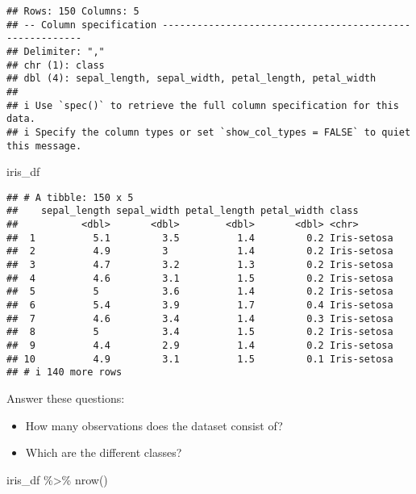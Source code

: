 \documentclass[
  oneside]{book}
\newenvironment{Shaded}{\begin{snugshade}}{\end{snugshade}}
\newcommand{\FunctionTok}[1]{\textcolor[rgb]{0.00,0.00,0.00}{#1}}
\newcommand{\NormalTok}[1]{#1}
\newcommand{\SpecialCharTok}[1]{\textcolor[rgb]{0.00,0.00,0.00}{#1}}
\providecommand{\tightlist}{%
  \setlength{\itemsep}{0pt}\setlength{\parskip}{0pt}}
\begin{document}
\begin{verbatim}
## Rows: 150 Columns: 5
## -- Column specification --------------------------------------------------------
## Delimiter: ","
## chr (1): class
## dbl (4): sepal_length, sepal_width, petal_length, petal_width
## 
## i Use `spec()` to retrieve the full column specification for this data.
## i Specify the column types or set `show_col_types = FALSE` to quiet this message.
\end{verbatim}

\begin{Shaded}
\begin{Highlighting}[]
\NormalTok{iris\_df}
\end{Highlighting}
\end{Shaded}

\begin{verbatim}
## # A tibble: 150 x 5
##    sepal_length sepal_width petal_length petal_width class      
##           <dbl>       <dbl>        <dbl>       <dbl> <chr>      
##  1          5.1         3.5          1.4         0.2 Iris-setosa
##  2          4.9         3            1.4         0.2 Iris-setosa
##  3          4.7         3.2          1.3         0.2 Iris-setosa
##  4          4.6         3.1          1.5         0.2 Iris-setosa
##  5          5           3.6          1.4         0.2 Iris-setosa
##  6          5.4         3.9          1.7         0.4 Iris-setosa
##  7          4.6         3.4          1.4         0.3 Iris-setosa
##  8          5           3.4          1.5         0.2 Iris-setosa
##  9          4.4         2.9          1.4         0.2 Iris-setosa
## 10          4.9         3.1          1.5         0.1 Iris-setosa
## # i 140 more rows
\end{verbatim}

Answer these questions:

\begin{itemize}
\tightlist
\item
  How many observations does the dataset consist of?
\item
  Which are the different classes?
\end{itemize}

\begin{Shaded}
\begin{Highlighting}[]
\NormalTok{iris\_df }\SpecialCharTok{\%\textgreater{}\%}
  \FunctionTok{nrow}\NormalTok{()}
\end{Highlighting}
\end{Shaded}
\end{document}
